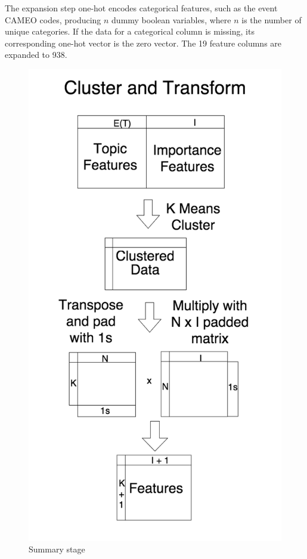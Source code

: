 The expansion step one-hot encodes categorical features, such as the event CAMEO codes, producing $n$ dummy boolean variables, where $n$ is the number of unique categories. If the data for a categorical column is missing, its corresponding one-hot vector is the zero vector. The 19 feature columns are expanded to 938.


\begin{figure}[ht]
\vskip 0.2in
\begin{center}
\centerline{\includegraphics[scale=0.15]{images/cluster_and_transform_vertical.png}}
\caption{Summary stage}
\end{center}
\vskip -0.2in
\label{fig:summarization}
\end{figure}

